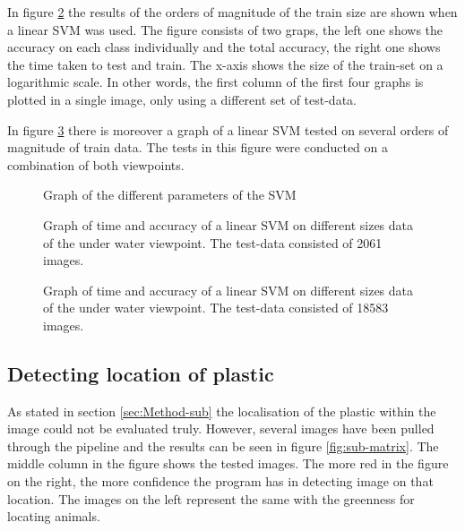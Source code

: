 In figure \ref{fig:lin1} the results of the orders of magnitude of the train size are shown when a linear SVM was used. The figure consists of two graps, the left one shows the accuracy on each class individually and the total accuracy, the right one shows the time taken to test and train. The x-axis shows the size of the train-set on a logarithmic scale.
In other words, the first column of the first four graphs is plotted in a single image, only using a different set of test-data.

In figure \ref{fig:lin2} there is moreover a graph of a linear SVM tested on several orders of magnitude of train data.
The tests in this figure were conducted on a combination of both viewpoints.

\begin{figure}[h!tb]
\centering
\ifx\showfig\undefined
 


 \fi
\caption{Graph of the different parameters of the SVM}
\label{fig:c14}
\end{figure}

\begin{figure}[h!tb]
\centering
\ifx\showfig\undefined
 \fi
\caption{Graph of time and accuracy of a linear SVM on different sizes data of the under water viewpoint. The test-data consisted of 2061 images.}
\label{fig:lin1}
\end{figure}

\begin{figure}[h!tb]
\centering
\ifx\showfig\undefined
 \fi
\caption{Graph of time and accuracy of a linear SVM on different sizes data of the under water viewpoint. The test-data consisted of 18583 images.}
\label{fig:lin2}
\end{figure}

\subsection{Detecting location of plastic}
\label{sec:Results-sub}
As stated in section \ref{sec:Method-sub} the localisation of the plastic within the image could not be evaluated truly.
However, several images have been pulled through the pipeline and the results can be seen in figure \ref{fig:sub-matrix}.
The middle column in the figure shows the tested images.
The more red in the figure on the right, the more confidence the program has in detecting image on that location.
The images on the left represent the same with the greenness for locating animals.

